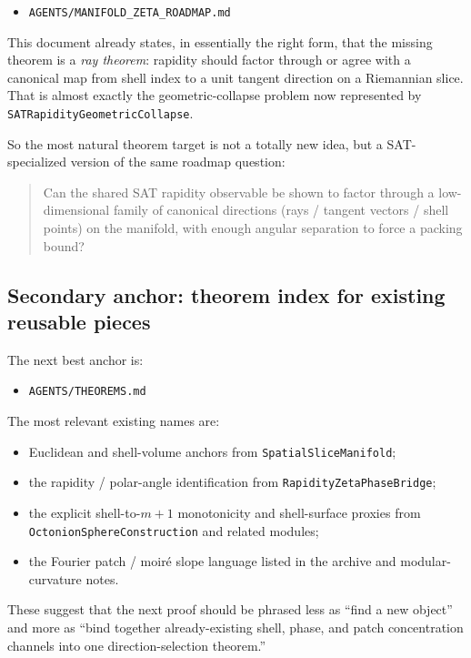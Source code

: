 \documentclass[11pt]{article}
\begin{document}
\begin{itemize}[leftmargin=2em]
  \item \texttt{AGENTS/MANIFOLD\_ZETA\_ROADMAP.md}
\end{itemize}

This document already states, in essentially the right form, that the missing theorem is a
\emph{ray theorem}: rapidity should factor through or agree with a canonical map from shell index
to a unit tangent direction on a Riemannian slice. That is almost exactly the geometric-collapse
problem now represented by \texttt{SATRapidityGeometricCollapse}.

So the most natural theorem target is not a totally new idea, but a SAT-specialized version of the
same roadmap question:

\begin{quote}
Can the shared SAT rapidity observable be shown to factor through a low-dimensional family of
canonical directions (rays / tangent vectors / shell points) on the manifold, with enough angular
separation to force a packing bound?
\end{quote}

\subsection{Secondary anchor: theorem index for existing reusable pieces}

The next best anchor is:

\begin{itemize}[leftmargin=2em]
  \item \texttt{AGENTS/THEOREMS.md}
\end{itemize}

The most relevant existing names are:

\begin{itemize}[leftmargin=2em]
  \item Euclidean and shell-volume anchors from \texttt{SpatialSliceManifold};
  \item the rapidity / polar-angle identification from
  \texttt{RapidityZetaPhaseBridge};
  \item the explicit shell-to-\(m+1\) monotonicity and shell-surface proxies from
  \texttt{OctonionSphereConstruction} and related modules;
  \item the Fourier patch / moir\'e slope language listed in the archive and modular-curvature notes.
\end{itemize}

These suggest that the next proof should be phrased less as ``find a new object'' and more as
``bind together already-existing shell, phase, and patch concentration channels into one direction-selection theorem.''
\end{document}
